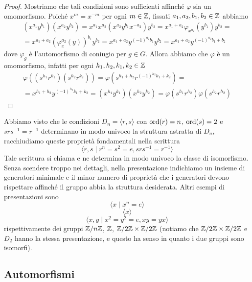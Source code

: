 \documentclass[11pt]{scrartcl}
\begin{document}
\begin{proof}
    Mostriamo che tali condizioni sono sufficienti affinché $\varphi$ sia un 
    omomorfismo. Poiché $x^m = x^{-m}$ per ogni $m \in \mathbb Z$, fissati 
    $a_1, a_2, b_1, b_2 \in \mathbb Z$ abbiamo 
    \begin{multline*}
        (x^{a_1}y^{b_1})(x^{a_2}y^{b_2}) = x^{a_1}x^{a_2}(x^{a_2}y^{b_1}x^{-a_2})y^{b_2} = 
        x^{a_1 + a_2}\varphi_{x^{a_2}}(y^{b_1})y^{b_2} = \\
        = x^{a_1 + a_2} (\varphi_x^{a_2}(y))^{b_1}y^{b_2} =
        x^{a_1 + a_2}y^{(-1)^{a_2}b_1}y^{b_2} = x^{a_1 + a_2}y^{(-1)^{a_2}b_1 + b_2}
    \end{multline*}dove $\varphi_g$ è l'automorfismo di coniugio per $g \in G$.
    Allora abbiamo che $\varphi$ è un omomorfismo, infatti per ogni $h_1, h_2, k_1, k_2 \in \mathbb Z$
    \begin{multline*}
        \varphi((s^{h_1}r^{k_1})(s^{h_2}r^{k_2})) = \varphi(s^{h_1 + h_2}r^{(-1)^{h_2}k_1 + k_2}) =\\
        = x^{h_1 + h_2}y^{(-1)^{h_2}k_1 + k_2} = (x^{h_1}y^{k_1})(x^{h_2}y^{k_2}) = 
        \varphi(s^{h_1}r^{h_2})\varphi(s^{h_2}r^{h_2})
    \end{multline*}
\end{proof}

\begin{remark}
    Abbiamo visto che le condizioni $D_n = \langle r, s\rangle$ con $\operatorname{ord}(r) = n$,
    $\operatorname{ord}(s) = 2$ e $srs^{-1} = r^{-1}$ determinano in modo univoco 
    la struttura astratta di $D_n$, racchiudiamo queste proprietà fondamentali
    nella scrittura
    \[
        \langle r, s\mid r^n = s^2 = e, srs^{-1} = r^{-1}\rangle
    \]
    Tale scrittura si chiama  e ne determina 
    in modo univoco la classe di isomorfismo. Senza scendere troppo nei dettagli,
    nella presentazione indichiamo un insieme di generatori minimale e il 
    minor numero di proprietà che i generatori devono rispettare affinché il 
    gruppo abbia la struttura desiderata. Altri esempi di presentazioni sono
    \[
        \langle x \mid x^n = e\rangle
    \]
    \[
        \langle x\rangle
    \]
    \[
        \langle x, y \mid x^2 = y^2 = e, xy = yx\rangle
    \]
    rispettivamente dei gruppi ${\mathbb Z}/n{\mathbb Z}$, $\mathbb Z$, $\mathbb{Z}/{2}\mathbb{Z}\times\mathbb{Z}/{2}\mathbb{Z}$
    (notiamo che $\mathbb{Z}/{2}\mathbb{Z}\times\mathbb{Z}/{2}\mathbb{Z}$ e $D_2$ hanno la stessa presentazione,
    e questo ha senso in quanto i due gruppi sono isomorfi).
\end{remark}


\subsection{Automorfismi}
\end{document}
